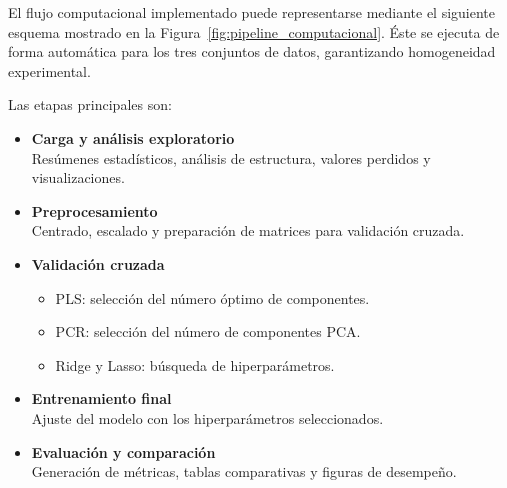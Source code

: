 \documentclass[12pt,a4paper]{report}
\begin{document}
El flujo computacional implementado puede representarse mediante el siguiente esquema mostrado en la Figura~\ref{fig:pipeline_computacional}. Éste se ejecuta de forma automática para los tres conjuntos de datos, garantizando homogeneidad experimental.

Las etapas principales son:

\begin{itemize}

\item \textbf{Carga y análisis exploratorio}\\
Resúmenes estadísticos, análisis de estructura, valores perdidos y visualizaciones.

\item \textbf{Preprocesamiento}\\
Centrado, escalado y preparación de matrices para validación cruzada.

\item \textbf{Validación cruzada}
\begin{itemize}
    \item PLS: selección del número óptimo de componentes.
    \item PCR: selección del número de componentes PCA.
    \item Ridge y Lasso: búsqueda de hiperparámetros.
\end{itemize}

\item \textbf{Entrenamiento final}\\
Ajuste del modelo con los hiperparámetros seleccionados.

\item \textbf{Evaluación y comparación}\\
Generación de métricas, tablas comparativas y figuras de desempeño.

\end{itemize}
\end{document}
